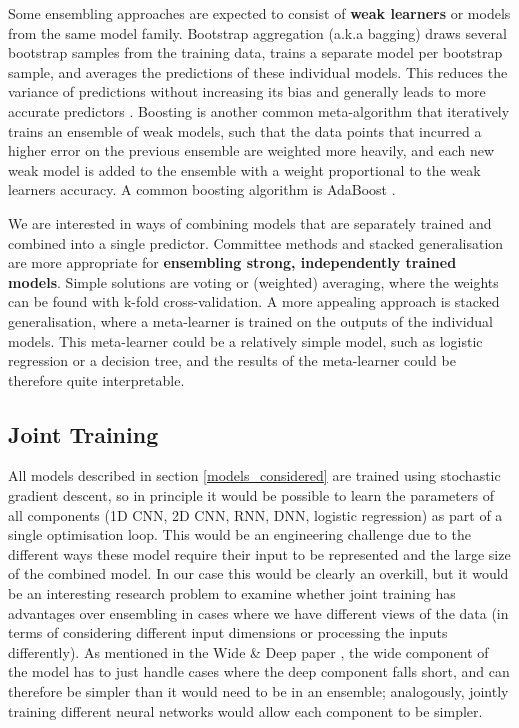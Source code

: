 Some ensembling approaches  are expected to consist of \textbf{weak learners} or models from the same model family.
Bootstrap aggregation (a.k.a bagging)   draws several bootstrap samples  from the training data,  trains a separate model per bootstrap sample,  and averages the predictions of these individual models.  This reduces the variance of predictions without increasing its bias and generally leads to  more accurate predictors \cite{bagging}.
Boosting is another common meta-algorithm that iteratively trains an ensemble of weak models, such that the data points that incurred a higher error on the previous ensemble are weighted more heavily, and each new weak model is added to the ensemble with a weight proportional to the weak learners accuracy.
A common boosting algorithm is AdaBoost \cite{adaboost}.

We are interested in ways of combining models that are separately trained and combined into a single predictor.
Committee methods and stacked generalisation are more appropriate for \textbf{ensembling strong, independently trained models}.
Simple solutions are voting or (weighted) averaging, where the weights can be found with k-fold cross-validation.
A more appealing approach is stacked generalisation, where a meta-learner is trained on the outputs of the individual models.
This meta-learner could be a relatively simple model, such as logistic regression or a decision tree, and the results of the meta-learner could be therefore quite interpretable.

\subsection{Joint Training}
\label{joint}

All models described in section \ref{models_considered} are trained using stochastic gradient descent, so in principle it would be possible to learn the parameters of all components (1D CNN, 2D CNN, RNN, DNN, logistic regression) as part of a single optimisation loop.
This would be an engineering challenge due to the different ways these model require their input to be represented and the large size of the combined model.
In our case this would be clearly an overkill, but it would be an interesting research problem to examine whether joint training has advantages over ensembling in cases where we have different views of the data (in terms of considering different input dimensions or processing the inputs differently).
As mentioned in the Wide \& Deep paper \cite{wide_deep}, the wide component of the model has to just handle cases where the deep component falls short, and can therefore be simpler than it would need to be in an ensemble; analogously, jointly training different neural networks would allow each component to be simpler.

